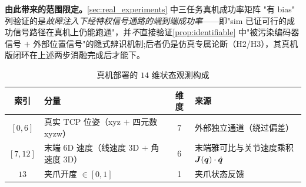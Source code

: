 \textbf{由此带来的范围限定。}\cref{sec:real_experiments} 中三任务真机成功率矩阵 "有 bias" 列验证的是\emph{故障注入下经特权信号通路的端到端成功率}——即"sim 已证可行的成功信号路径在真机上仍能跑通"，并\emph{不}直接验证\cref{prop:identifiable} 中"被污染编码器信号 $+$ 外部位置信号"的隐式辨识机制;后者仍是仿真专属论断（H2/H3），其真机版闭环在上述两步消融完成后才能下。

\begin{table}[htbp]
  \centering
  \caption{真机部署的 $14$ 维状态观测构成}
  \label{tab:obs_real_14d}
  \small
  \begin{tabular}{@{}clcl@{}}
    \toprule
    索引 & 分量 & 维度 & 来源 \\
    \midrule
    $[0, 6]$  & 真实 TCP 位姿（xyz $+$ 四元数 xyzw） & 7 & 外部独立通道（绕过偏差） \\
    $[7, 12]$ & 末端 6D 速度（线速度 3D $+$ 角速度 3D） & 6 & 末端雅可比与关节速度乘积 $\bm{J}(\bm{q}) \cdot \dot{\bm{q}}$ \\
    $13$      & 夹爪开度 $\in [0, 1]$ & 1 & 夹爪状态反馈 \\
    \bottomrule
  \end{tabular}
\end{table}

